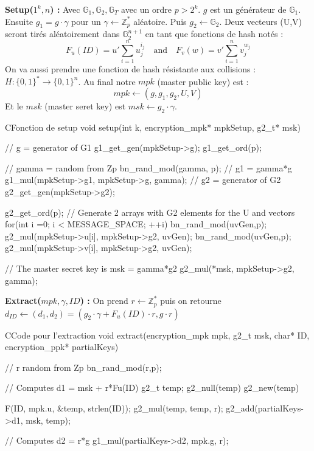 \textbf{Setup($1^k, n$) :} Avec $\mathbb{G}_1, \mathbb{G}_2, \mathbb{G}_T$ avec un ordre $p > 2^k$. $g$ est un générateur de $\mathbb{G}_1$. Ensuite  $g_1 = g \cdot \gamma$ pour un $\gamma \leftarrow  \mathbb{Z}_p^*$ aléatoire. Puis $g_2 \leftarrow \mathbb{G}_2$. Deux vecteurs (U,V) seront tirés aléatoirement dans $\mathbb{G}_2^{n+1}$ en tant que fonctions de hash notés :
\[F_u(ID) = u' \sum_{i=1}^{n} u_j^{i_j}\quad\mathrm{and}\quad F_v(w) = v' \sum_{i=1}^{n} v_j^{w_j}\]
On va aussi prendre une fonction de hash résistante aux collisions : $H : \{0,1\}^* \rightarrow \{0,1\}^n$. Au final notre $mpk$ (master public key) est :
\[mpk \leftarrow (g, g_1, g_2, U, V)\]
Et le $msk$ (master seret key) est $msk \leftarrow g_2 \cdot \gamma$.

\begin{sourcebox}{C}{Fonction de setup}
	void setup(int k, encryption_mpk* mpkSetup, g2_t* msk){
		// g = generator of G1
		g1_get_gen(mpkSetup->g);
		g1_get_ord(p);
		
		// gamma = random from Zp
		bn_rand_mod(gamma, p);
		// g1 = gamma*g
		g1_mul(mpkSetup->g1, mpkSetup->g, gamma);
		// g2 = generator of G2
		g2_get_gen(mpkSetup->g2);
		
		g2_get_ord(p);
		// Generate 2 arrays with G2 elements for the U and  vectors
		for(int i =0; i < MESSAGE_SPACE; ++i){
			bn_rand_mod(uvGen,p);
			g2_mul(mpkSetup->u[i], mpkSetup->g2, uvGen);
			bn_rand_mod(uvGen,p);
			g2_mul(mpkSetup->v[i], mpkSetup->g2, uvGen);
		}
		
		// The master secret key is msk = gamma*g2
		g2_mul(*msk, mpkSetup->g2, gamma);
	}
\end{sourcebox}

\textbf{Extract($mpk, \gamma, ID$) :} On prend $r \leftarrow \mathbb{Z}_p^*$ puis on retourne $d_{ID} \leftarrow (d_1, d_2) = (g_2 \cdot \gamma + F_u(ID) \cdot r, g \cdot r)$

\begin{sourcebox}{C}{Code pour l'extraction}
	void extract(encryption_mpk mpk, g2_t msk, char* ID, encryption_ppk* partialKeys){
		// r random from Zp
		bn_rand_mod(r,p);
		
		// Computes d1 = msk + r*Fu(ID)
		g2_t temp;
		g2_null(temp)
		g2_new(temp)
		
		F(ID, mpk.u, &temp, strlen(ID));
		g2_mul(temp, temp, r);
		g2_add(partialKeys->d1, msk, temp);
		
		// Computes d2 = r*g
		g1_mul(partialKeys->d2, mpk.g, r);
	}
\end{sourcebox}

